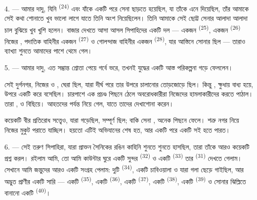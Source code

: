 \VUsaut{4.0mm}
\VUsaut{2.8mm}

4. --- আমার দাদু, যিনি  \textsuperscript{(24)} এবং
যাঁকে একটি  পরে সেনা ছাড়তে হয়েছিল, যা তাঁকে  এনে দিয়েছিল, তাঁর আমাকে সেই  কথা শোনাতে খুব ভালো লাগে
যাতে তিনি অংশ নিয়েছিলেন। তিনি আমাকে সেই ছোট্ট সেনার আলাদা আলাদা চাল বুঝিয়ে
খুব খুশি হলেন। বাজার দেখতে আসা আসল সিপাহিদের একটি দল --- একজন  \textsuperscript{(25)}, একজন 
\textsuperscript{(26)} নিজের , পদাতিক বাহিনীর একজন
 \textsuperscript{(27)} ও গোলন্দাজ বাহিনীর একজন
 \textsuperscript{(28)}, যার আস্তিনে সোনার  ছিল
--- তারাও ব্যাখ্যা শুনতে আমাদের পাশে থেমে গেল।

5. --- আমার দাদু, এত সম্ভ্রান্ত শ্রোতা পেয়ে গর্বে ভরে, তখনই যুদ্ধের একটি
আস্ত পরিকল্পনা গড়ে ফেললেন।

সেই দুর্গনগর, নিজের  ও , 
ঘেরা ছিল, যারা দীর্ঘ  পরে তার উপরে  চালানোর
তোড়জোড়ে ছিল। কিন্তু , ক্ষুধায় বাধ্য হয়ে,
  উপরে একটি 
করে বসেছিল।  চারপাশে এক প্রচণ্ড 
 পিছনে ঠেলে  অবরোধকারীরা নিজেদের
  হামলাকারীদের  করতে পাঠাল।
তারা ,   ও 
বিছিয়ে।  আহতদের  পর্যন্ত
নিয়ে গেল, যাতে  তাদের দেখাশোনা করেন।

কয়েকটি  বীর প্রতিরোধ সত্ত্বেও, যারা  গড়েছিল,  সম্পূর্ণ ছিল; বাকি সেনা , অনেক  পিছনে ফেলে। শত্রু নগর নিয়ে নিজের 
মুকুট পরাতে যাচ্ছিল। হয়তো এটিই অভিযানের শেষ হত, আর একটি 
পরে একটি  সই হতে পারত।

\VUsaut{4.4mm}
\VUsaut{2.8mm}

6. --- সেই তরুণ সিপাহিরা, যারা প্রাক্তন সৈনিকের রঙিন কাহিনি শুনতে শুনতে হাসছিল,
তারা তাঁকে আরও কয়েকটি প্রশ্ন করল। রইলাম আমি, তো আমি কাউন্টার ঘুরে একটি সুন্দর
 \textsuperscript{(32)} ও একটি 
\textsuperscript{(33)} তার  \textsuperscript{(31)} দেখতে গেলাম।
সেখানে আমি জন্তুদের আরও একটি সংগ্রহ পেলাম: দুটি 
\textsuperscript{(34)}, একটি চাবিওয়ালা  ও  যারা
গলা ছেড়ে গাইছিল, আর অদ্ভুত প্রাণীর একটি সারি --- একটি 
\textsuperscript{(35)}, একটি  \textsuperscript{(36)}, একটি
 \textsuperscript{(37)}, একটি  \textsuperscript{(38)},
একটি  \textsuperscript{(39)} ও সোনার ঝিল্লিতে বানানো একটি
 \textsuperscript{(40)}।

